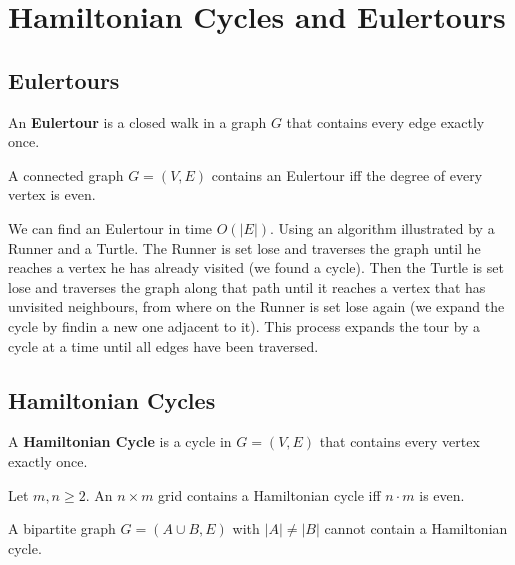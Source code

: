 \section{Hamiltonian Cycles and Eulertours}

\subsection{Eulertours}

\begin{definition}
	An \textbf{Eulertour} is a closed walk in a graph $G$ that contains every edge exactly once.
\end{definition}

\begin{theorem}
	A connected graph $G = (V, E)$ contains an Eulertour iff the degree of every vertex is even.
\end{theorem}

\begin{remark}
	We can find an Eulertour in time $O(|E|)$. Using an algorithm illustrated by a Runner and a Turtle. The
	Runner is set lose and traverses the graph until he reaches a vertex he has already visited (we found a
	cycle). Then the Turtle
	is set lose and traverses the graph along that path until it reaches a vertex that has unvisited neighbours,
	from where on the Runner is set lose again (we expand the cycle by findin a new one adjacent to it). This
	process expands the tour by a cycle at a time until all
	edges have been traversed.
\end{remark}

\subsection{Hamiltonian Cycles}

\begin{definition}
	A \textbf{Hamiltonian Cycle} is a cycle in $G = (V, E)$ that contains every vertex exactly once.
\end{definition}

\begin{theorem}
	Let $m, n \ge 2$. An $n \times m$ grid contains a Hamiltonian cycle iff $n \cdot m$ is even.
\end{theorem}

\begin{theorem}
	A bipartite graph $G = (A \cup B, E)$ with $|A| \neq |B|$ cannot contain a Hamiltonian cycle.
\end{theorem}

